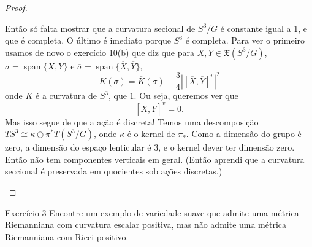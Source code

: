 \begin{proof}
\begin{enumerate}[label=(\alph*)]
	Então só falta mostrar que a curvatura secional de \(S^3/G\) é constante igual a 1, e que é completa. O último é imediato porque \(S^3\) é completa. Para ver o primeiro usamos de novo o exercício 10(b) que diz que para \(X,Y \in \mathfrak{X}(S^3/G)\), \(\sigma=\operatorname{span}\{X,Y\}\) e \(\overline{\sigma}=\operatorname{span}\{\overline{X}, \overline{Y}\}\),
\[\boxed{K(\sigma)=\overline{K}(\overline{\sigma})+\frac{3}{4}\left|\left[ \overline{X},\overline{Y} \right]^v\right|^2}\]
onde \(\overline{K}\) é a curvatura de \(S^3\), que \(1\). Ou seja, queremos ver que
\[\left[ \overline{X},\overline{Y} \right]^v=0.\]
Mas isso segue de que a ação é discreta! Temos uma descomposição \(TS^3 \cong \kappa \oplus  \pi^*T(S^3/G)\), onde \(\kappa\) é o kernel de \(\pi_*\). Como a dimensão do grupo é zero, a dimensão do espaço lenticular é 3, e o kernel dever ter dimensão zero. Então não tem componentes verticais em geral. (Então aprendi que a curvatura seccional é preservada em quocientes sob ações discretas.)
\end{enumerate}
\end{proof}

\begin{thing6}{Exercício 3}\label{exer:3}\leavevmode
Encontre um exemplo de variedade suave que admite uma métrica Riemanniana com curvatura escalar positiva, mas não admite uma métrica Riemanniana com Ricci positivo.
\end{thing6}

